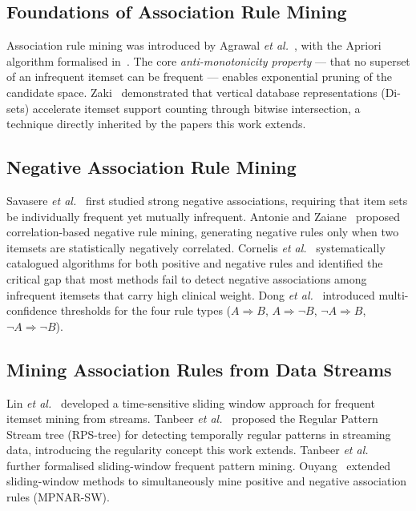 \documentclass[10pt,twocolumn]{article}
\theoremstyle{plain}
\theoremstyle{definition}
\theoremstyle{remark}
\newcommand{\etal}{\textit{et al.}\xspace}
\begin{document}
\subsection{Foundations of Association Rule Mining}

Association rule mining was introduced by Agrawal
\etal~\cite{agrawal1993}, with the Apriori algorithm formalised
in~\cite{agrawal1994}.
The core \emph{anti-monotonicity property} — that no superset of an
infrequent itemset can be frequent — enables exponential pruning of
the candidate space.
Zaki~\cite{zaki2003} demonstrated that vertical database
representations (Di-sets) accelerate itemset support counting through
bitwise intersection, a technique directly inherited by the papers
this work extends.

\subsection{Negative Association Rule Mining}

Savasere \etal~\cite{savasere1998} first studied strong negative
associations, requiring that item sets be individually frequent yet
mutually infrequent.
Antonie and Zaiane~\cite{antonie2004} proposed correlation-based
negative rule mining, generating negative rules only when two itemsets
are statistically negatively correlated.
Cornelis \etal~\cite{cornelis2006} systematically catalogued
algorithms for both positive and negative rules and identified the
critical gap that most methods fail to detect negative associations
among infrequent itemsets that carry high clinical weight.
Dong \etal~\cite{dong2006} introduced multi-confidence thresholds for
the four rule types ($A\!\Rightarrow\!B$, $A\!\Rightarrow\!\lnot B$,
$\lnot A\!\Rightarrow\!B$, $\lnot A\!\Rightarrow\!\lnot B$).

\subsection{Mining Association Rules from Data Streams}

Lin \etal~\cite{lin2006} developed a time-sensitive sliding window
approach for frequent itemset mining from streams.
Tanbeer \etal~\cite{tanbeer2010stream} proposed the Regular Pattern
Stream tree (RPS-tree) for detecting temporally regular patterns in
streaming data, introducing the regularity concept this work extends.
Tanbeer \etal~\cite{tanbeer2009sliding} further formalised
sliding-window frequent pattern mining.
Ouyang~\cite{ouyang2013} extended sliding-window methods to
simultaneously mine positive and negative association rules
(MPNAR-SW).
\end{document}
